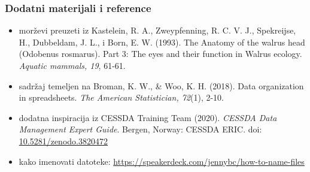 \documentclass[aspectratio=169]{beamer}
\newenvironment{noheadline}{
    \setbeamertemplate{headline}{}
}{}
\begin{document}
\begin{noheadline}
    \begin{frame}
        \frametitle{Dodatni materijali i reference}

        \fontsize{10}{12}\selectfont

        \begin{itemize}
            \setlength{\itemsep}{1em}
            
            \item morževi preuzeti iz Kastelein, R. A., Zweypfenning, R. C. V.
                J., Spekreijse, H., Dubbeldam, J. L., i Born, E. W. (1993). The
                Anatomy of the walrus head (Odobenus rosmarus). Part 3: The eyes
                and their function in Walrus ecology. \textit{Aquatic mammals, 19},
                61-61.

            \item sadržaj temeljen na Broman, K. W., & Woo, K. H. (2018). Data
                organization in spreadsheets. \textit{The American Statistician,
                72}(1), 2-10.

            \item dodatna inspiracija iz CESSDA Training Team (2020). \textit{CESSDA
                Data Management Expert Guide}. Bergen, Norway: CESSDA ERIC. doi:
                \url{10.5281/zenodo.3820472}

            \item kako imenovati datoteke:
                \url{https://speakerdeck.com/jennybc/how-to-name-files}
            
        \end{itemize}
    \end{frame}
\end{noheadline}
\end{document}
